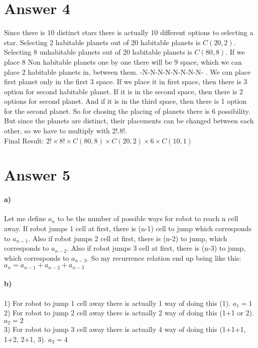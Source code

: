 \documentclass[12pt]{article}
\begin{document}
\section*{Answer 4}
Since there is 10 distinct stars there is actually 10 different options to selecting a star. Selecting 2 habitable planets out of 20 habitable planets is $C(20,2)$. Selecting 8 unhabitable planets out of 20 habitable planets is $C(80,8)$. If we place 8 Non habitable planets one by one there will be 9 space, which we can place 2 habitable planets in, between them. -N-N-N-N-N-N-N-N- . We can place first planet only in the first 3 space. If we place it in first space, then there is 3 option for second habitable planet. If it is in the second space, then there is 2 options for second planet. And if it is in the third space, then there is 1 option for the second planet. So for chosing the placing of planets there is 6 possibility. But since the planets are distinct, their placements can be changed between each other, so we have to multiply with 2!.8!.\\
Final Result: $2!\times8!\times C(80,8)\times C(20,2)\times 6 \times C(10,1)$

\section*{Answer 5}
\paragraph{a)}
Let me define $a_n$ to be the number of possible ways for robot to reach n cell away. If robot jumps 1 cell at first, there is (n-1) cell to jump which corresponds to $a_{n-1}$. Also if robot jumps 2 cell at first, there is (n-2) to jump, which corresponds to $a_{n-2}$. Also if robot jumps 3 cell at first, there is (n-3) to jump, which corresponds to $a_{n-3}$. So my recurrence relation end up being like this: \\$a_{n}=a_{n-1}+a_{n-2}+a_{n-3}$ 
\paragraph{b)}
1) For robot to jump 1 cell away there is actually 1 way of doing this (1). $a_1=1$ \\
2) For robot to jump 2 cell away there is actually 2 way of doing this (1+1 or 2). $a_2=2$\\
3) For robot to jump 3 cell away there is actually 4 way of doing this (1+1+1, 1+2, 2+1, 3). $a_3=4$
\end{document}
